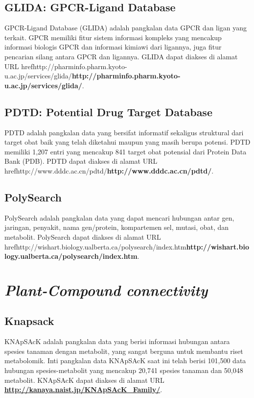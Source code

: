 	\subsection{GLIDA: GPCR-Ligand Database} \label{glida}
	GPCR-Ligand Database (GLIDA) adalah pangkalan data GPCR dan ligan yang terkait. GPCR memiliki fitur sistem informasi kompleks yang mencakup informasi biologis GPCR dan informasi kimiawi dari ligannya, juga fitur pencarian silang antara GPCR dan ligannya. GLIDA dapat diakses di alamat URL href{http://pharminfo.pharm.kyoto-u.ac.jp/services/glida/}{\textbf{http://pharminfo.pharm.kyoto-u.ac.jp/services/glida/}}.

	\subsection{PDTD: Potential Drug Target Database} \label{pdtd}
	PDTD adalah pangkalan data yang bersifat informatif sekaligus struktural dari target obat baik yang telah diketahui maupun yang masih berupa potensi. PDTD memiliki 1,207 entri yang mencakup 841 target obat potensial dari Protein Data Bank (PDB). PDTD dapat diakses di alamat URL href{http://www.dddc.ac.cn/pdtd/}{\textbf{http://www.dddc.ac.cn/pdtd/}}.

	\subsection{PolySearch} \label{polysearch}
	PolySearch adalah pangkalan data yang dapat mencari hubungan antar gen, jaringan, penyakit, nama gen/protein, kompartemen sel, mutasi, obat, dan metabolit. PolySearch dapat diakses di alamat URL href{http://wishart.biology.ualberta.ca/polysearch/index.htm}{\textbf{http://wishart.biology.ualberta.ca/polysearch/index.htm}}.

\section{\emph{Plant-Compound connectivity}}
	\subsection{Knapsack} \label{knapsack}
	KNApSAcK adalah pangkalan data yang berisi informasi hubungan antara spesies tanaman dengan metabolit, yang sangat berguna untuk membantu riset metabolomik. Inti pangkalan data KNApSAcK saat ini telah berisi 101,500 data hubungan spesies-metabolit yang mencakup 20,741 spesies tanaman dan 50,048 metabolit. KNApSAcK dapat diakses di alamat URL \href{http://kanaya.naist.jp/KNApSAcK_Family/}{\textbf{http://kanaya.naist.jp/KNApSAcK\_Family/}}.

